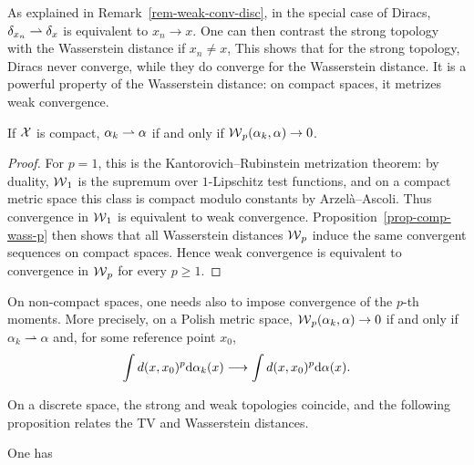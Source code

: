 As explained in Remark~\ref{rem-weak-conv-disc}, in the special case of Diracs, $\delta_{x_n} \rightharpoonup \delta_x$  is equivalent to $x_n \rightarrow x$. One can then contrast the strong topology with the Wasserstein distance if $x_n \neq x$,
This shows that for the strong topology, Diracs never converge, while they do converge for the Wasserstein distance. It is a powerful property of the Wasserstein distance: on compact spaces, it metrizes weak convergence.

\begin{prop}\label{prop-wass-metrizes-weak-compact}
	If $\mathcal{X}$ is compact, $\alpha_k \rightharpoonup \alpha$ if and only if $\operatorname{\mathcal{W}}_p(\alpha_k,\alpha) \rightarrow 0$.
\end{prop}
\begin{proof}
	For $p=1$, this is the Kantorovich--Rubinstein metrization theorem: by duality, $\operatorname{\mathcal{W}}_1$ is the supremum over $1$-Lipschitz test functions, and on a compact metric space this class is compact modulo constants by Arzel\`a--Ascoli. Thus convergence in $\operatorname{\mathcal{W}}_1$ is equivalent to weak convergence. Proposition~\ref{prop-comp-wass-p} then shows that all Wasserstein distances $\operatorname{\mathcal{W}}_p$ induce the same convergent sequences on compact spaces. Hence weak convergence is equivalent to convergence in $\operatorname{\mathcal{W}}_p$ for every $p\geq1$.
\end{proof}

On non-compact spaces, one needs also to impose convergence of the $p$-th moments. More precisely, on a Polish metric space, $\operatorname{\mathcal{W}}_p(\alpha_k,\alpha)\to0$ if and only if $\alpha_k\rightharpoonup\alpha$ and, for some reference point $x_0$,
\[
	\int d(x,x_0)^p\mathrm{d}\alpha_k(x)\longrightarrow
	\int d(x,x_0)^p\mathrm{d}\alpha(x).
\]

On a discrete space, the strong and weak topologies coincide, and the following proposition relates the TV and Wasserstein distances.

\begin{prop}
	One has
\end{prop}

